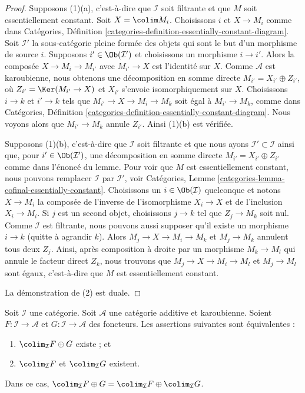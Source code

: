 \begin{proof}
Supposons (1)(a), c'est-à-dire que $\mathcal{I}$ soit filtrante et que $M$
soit essentiellement constant. Soit $X = \colim M_i$. Choisissons $i$ et
$X \to M_i$ comme dans
Catégories, Définition
\ref{categories-definition-essentially-constant-diagram}.
Soit $\mathcal{I}'$ la sous-catégorie pleine formée des objets qui sont le but
d'un morphisme de source $i$.
Supposons $i' \in \Ob(\mathcal{I}')$ et choisissons un morphisme $i \to i'$.
Alors la composée $X \to M_i \to M_{i'}$ avec $M_{i'} \to X$ est l'identité
sur $X$. Comme $\mathcal{A}$ est karoubienne, nous obtenons une décomposition
en somme directe $M_{i'} = X_{i'} \oplus Z_{i'}$, où
$Z_{i'} = \Ker(M_{i'} \to X)$ et $X_{i'}$ s'envoie isomorphiquement sur $X$.
Choisissons $i \to k$ et $i' \to k$ tels que
$M_{i'} \to X \to M_i \to M_k$
soit égal à $M_{i'} \to M_k$, comme dans Catégories, Définition
\ref{categories-definition-essentially-constant-diagram}.
Nous voyons alors que $M_{i'} \to M_k$ annule $Z_{i'}$.
Ainsi (1)(b) est vérifiée.

\medskip\noindent
Supposons (1)(b), c'est-à-dire que $\mathcal{I}$ soit filtrante et que nous
ayons $\mathcal{I}' \subset \mathcal{I}$ ainsi que, pour
$i' \in \Ob(\mathcal{I}')$, une décomposition en somme directe
$M_{i'} = X_{i'} \oplus Z_{i'}$
comme dans l'énoncé du lemme. Pour voir que $M$ est essentiellement constant,
nous pouvons remplacer $\mathcal{I}$ par $\mathcal{I}'$, voir
Catégories, Lemme \ref{categories-lemma-cofinal-essentially-constant}.
Choisissons un $i \in \Ob(\mathcal{I})$ quelconque
et notons $X \to M_i$ la composée de l'inverse de l'isomorphisme
$X_i \to X$ et de l'inclusion $X_i \to M_i$. Si $j$ est
un second objet, choisissons $j \to k$ tel que $Z_j \to M_k$ soit
nul. Comme $\mathcal{I}$ est filtrante, nous pouvons aussi supposer qu'il
existe un morphisme $i \to k$ (quitte à agrandir $k$). Alors
$M_j \to X \to M_i \to M_k$ et $M_j \to M_k$ annulent tous deux $Z_j$.
Ainsi, après composition à droite par un morphisme $M_k \to M_l$ qui annule
le facteur direct $Z_k$, nous trouvons que
$M_j \to X \to M_i \to M_l$ et
$M_j \to M_l$ sont égaux, c'est-à-dire que $M$ est essentiellement constant.

\medskip\noindent
La démonstration de (2) est duale.
\end{proof}

\begin{lemma}
\label{lemma-direct-sum-from-product-colimit}
Soit $\mathcal{I}$ une catégorie. Soit $\mathcal{A}$ une catégorie additive
et karoubienne. Soient $F : \mathcal{I} \to \mathcal{A}$ et
$G : \mathcal{I} \to \mathcal{A}$ des foncteurs. Les assertions suivantes
sont équivalentes :
\begin{enumerate}
\item $\colim_\mathcal{I} F \oplus G$ existe ; et
\item $\colim_\mathcal{I} F$ et $\colim_\mathcal{I} G$ existent.
\end{enumerate}
Dans ce cas, $\colim_\mathcal{I} F \oplus G =
\colim_\mathcal{I} F \oplus \colim_\mathcal{I} G$.
\end{lemma}

